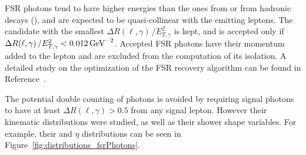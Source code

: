 FSR photons tend to have higher energies than the ones from \pileup{} or from hadronic decays (\eg \PGpz),
and are expected to be quasi-collinear with the emitting leptons.
The candidate with the smallest $\Delta R(\ell, \gamma)\, / E_{T,\gamma}^{2}$ is kept,
and is accepted only if $\Delta R(\ell, \gamma)\, / E_{T,\gamma}^{2} < 0.012 \,\text{Ge\hspace{-.08em}V}^{-2}$.
Accepted FSR photons have their momentum added to the lepton and are excluded from the computation of its isolation.
A detailed study on the optimization of the FSR recovery algorithm can be found in Reference~\cite{CMS-HIG-16-041}.

The potential double counting of photons is avoided by requiring
signal photons to have at least $\Delta R(\ell, \gamma) > 0.5$ from any signal lepton.
However their kinematic distributions were studied, as well as their shower shape variables.
For example, their \pt and $\eta$ distributions can be seen in Figure~\ref{fig:distributions_fsrPhotons}.

